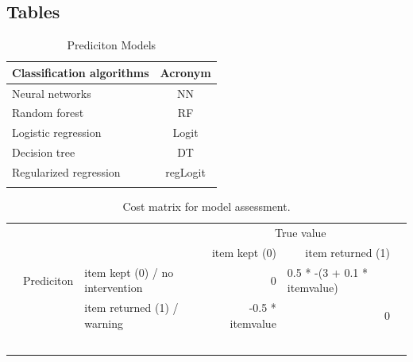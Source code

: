 \documentclass[12pt]{article}
\begin{document}
\begin{appendices}
\section{Tables}	
\thispagestyle{empty}
    \begin{table}[h]
\begin{center}
\begin{tabular}{lc} 
\hline\hline
Classification algorithms & Acronym\\ 
\hline
\noalign{\smallskip}
Neural networks &   NN  \\
Random forest &   RF   \\
Logistic regression &   Logit \\
Decision tree &   DT \\
Regularized regression  &   regLogit  \\
\noalign{\smallskip}
\hline\hline
\end{tabular}
\end{center}
\caption{Prediciton Models}
\label{tab:overview}
\end{table} 
\smallskip
\begin{table}[H]
\centering
\begin{tabular}{llllll}
 &            & \multicolumn{1}{l|}{}                                & \multicolumn{2}{c}{True value}                                              &  \\
 &            & \multicolumn{1}{l|}{}                                & \multicolumn{1}{r}{item kept (0)}    & \multicolumn{1}{r}{item returned (1)} &  \\ \cline{1-5}
 & Prediciton & \multicolumn{1}{l|}{item kept (0) / no intervention} & \multicolumn{1}{r}{0}                & 0.5 * -(3 + 0.1 * itemvalue)          &  \\
 &            & \multicolumn{1}{l|}{item returned (1) / warning}     & \multicolumn{1}{r}{-0.5 * itemvalue} & \multicolumn{1}{r}{0}                 &  \\
 &            &                                                      &                                      &                                       &  \\
 &            &                                                      &                                      &                                       &  \\
 &            &                                                      &                                      &                                       &  \\
 &            &                                                      &                                      &                                       &  \\
 &            &                                                      &                                      &                                       & 
\end{tabular}
\caption{Cost matrix for model assessment.}
\label{tab:cost matrix}
\end{table}
\end{appendices}
\newpage


\end{document}
